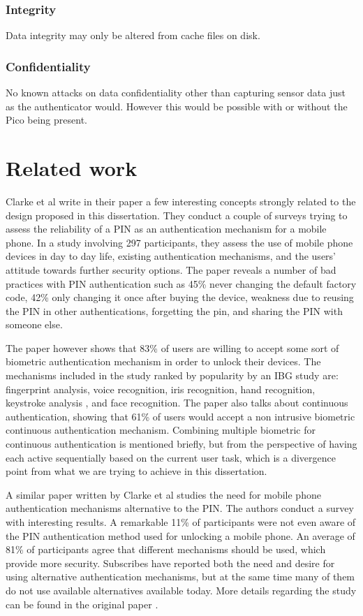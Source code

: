 	
	\subsubsection*{Integrity}
	Data integrity may only be altered from cache files on disk.
	
	\subsubsection*{Confidentiality}
	No known attacks on data confidentiality other than capturing sensor data just as the authenticator would. However this would be possible with or without the Pico being present.

\section{Related work}
Clarke et al write in their paper \cite{clarke2005authentication} a few interesting concepts strongly related to the design proposed in this dissertation. They conduct a couple of surveys trying to assess the reliability of a PIN as an authentication mechanism for a mobile phone. In a study involving 297 participants, they assess the use of mobile phone devices in day to day life, existing authentication mechanisms, and the users' attitude towards further security options. The paper reveals a number of bad practices with PIN authentication such as 45\% never changing the default factory code, 42\% only changing it once after buying the device, weakness due to reusing the PIN in other authentications, forgetting the pin, and sharing the PIN with someone else.

The paper \cite{clarke2005authentication} however shows that 83\% of users are willing to accept some sort of biometric authentication mechanism in order to unlock their devices. The mechanisms included in the study ranked by popularity by an IBG study \cite{} are: fingerprint analysis, voice recognition, iris recognition, hand recognition, keystroke analysis \cite{clarke2003using}, and face recognition. The paper also talks about continuous authentication, showing that 61\% of users would accept a non intrusive biometric continuous authentication mechanism. Combining multiple biometric for continuous authentication is mentioned briefly, but from the perspective of having each active sequentially based on the current user task, which is a divergence point from what we are trying to achieve in this dissertation.

A similar paper \cite{clarke2002acceptance} written by Clarke et al studies the need for mobile phone authentication mechanisms alternative to the PIN. The authors conduct a survey with interesting results. A remarkable 11\% of participants were not even aware of the PIN authentication method used for unlocking a mobile phone. An average of 81\% of participants agree that different mechanisms should be used, which provide more security. Subscribes have reported both the need and desire for using alternative authentication mechanisms, but at the same time many of them do not use available alternatives available today. More details regarding the study can be found in the original paper \cite{clarke2002acceptance}.


